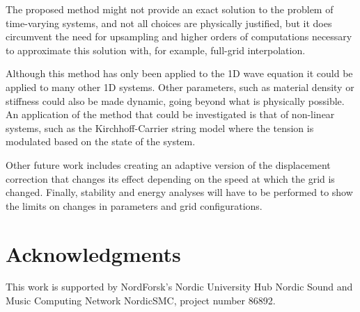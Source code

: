 The proposed method might not provide an exact solution to the problem of time-varying systems, and not all choices are physically justified, but it does circumvent the need for upsampling and higher orders of computations necessary to approximate this solution with, for example, full-grid interpolation. %
%


Although this method has only been applied to the 1D wave equation it could be applied to many other 1D systems. Other parameters, such as material density or stiffness could also be made dynamic, going beyond what is physically possible. An application of the method that could be investigated is that of non-linear systems, such as the Kirchhoff-Carrier string model \cite{Carrier1945} where the tension is modulated based on the state of the system.

Other future work includes creating an adaptive version of the displacement correction that changes its effect depending on the speed at which the grid is changed. Finally, stability and energy analyses will have to be performed to show the limits on changes in parameters and grid  configurations.

\section{Acknowledgments}
This work is supported by NordForsk's Nordic
University Hub Nordic Sound and Music Computing Network
NordicSMC, project number 86892.